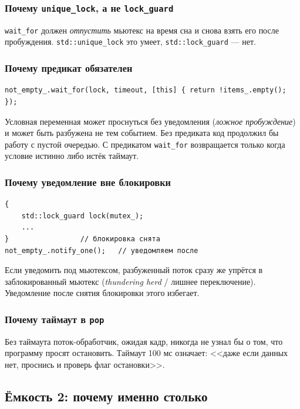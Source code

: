 \documentclass[11pt,a4paper]{article}
\theoremstyle{definition}
\theoremstyle{remark}
\begin{document}
\subsubsection{Почему \texttt{unique\_lock}, а не \texttt{lock\_guard}}

\texttt{wait\_for} должен \emph{отпустить} мьютекс на время сна и снова взять
его после пробуждения. \texttt{std::unique\_lock} это умеет,
\texttt{std::lock\_guard} --- нет.

\subsubsection{Почему предикат обязателен}

\begin{lstlisting}
not_empty_.wait_for(lock, timeout, [this] { return !items_.empty(); });
\end{lstlisting}

Условная переменная может проснуться без уведомления (\emph{ложное
пробуждение}) и может быть разбужена не тем событием. Без предиката код
продолжил бы работу с пустой очередью. С предикатом \texttt{wait\_for}
возвращается только когда условие истинно либо истёк таймаут.

\subsubsection{Почему уведомление вне блокировки}

\begin{lstlisting}
{
    std::lock_guard lock(mutex_);
    ...
}                 // блокировка снята
not_empty_.notify_one();   // уведомляем после
\end{lstlisting}

Если уведомить под мьютексом, разбуженный поток сразу же упрётся в
заблокированный мьютекс (\emph{thundering herd} / лишнее переключение).
Уведомление после снятия блокировки этого избегает.

\subsubsection{Почему таймаут в \texttt{pop}}

Без таймаута поток-обработчик, ожидая кадр, никогда не узнал бы о том, что
программу просят остановить. Таймаут 100 мс означает: <<даже если данных нет,
проснись и проверь флаг остановки>>.

\subsection{Ёмкость 2: почему именно столько}
\end{document}
